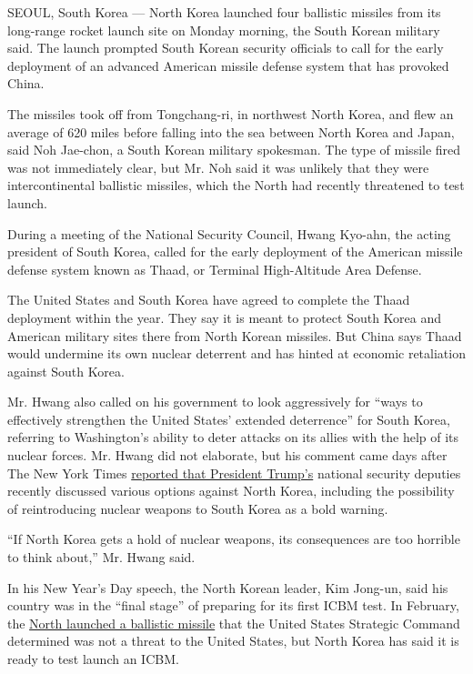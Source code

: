 SEOUL, South Korea --- North Korea launched four ballistic missiles from
its long-range rocket launch site on Monday morning, the South Korean
military said. The launch prompted South Korean security officials to
call for the early deployment of an advanced American missile defense
system that has provoked China.

The missiles took off from Tongchang-ri, in northwest North Korea, and
flew an average of 620 miles before falling into the sea between North
Korea and Japan, said Noh Jae-chon, a South Korean military spokesman.
The type of missile fired was not immediately clear, but Mr. Noh said it
was unlikely that they were intercontinental ballistic missiles, which
the North had recently threatened to test launch.

During a meeting of the National Security Council, Hwang Kyo-ahn, the
acting president of South Korea, called for the early deployment of the
American missile defense system known as Thaad, or Terminal
High-Altitude Area Defense.

The United States and South Korea have agreed to complete the Thaad
deployment within the year. They say it is meant to protect South Korea
and American military sites there from North Korean missiles. But China
says Thaad would undermine its own nuclear deterrent and has hinted at
economic retaliation against South Korea.

Mr. Hwang also called on his government to look aggressively for ``ways
to effectively strengthen the United States' extended deterrence'' for
South Korea, referring to Washington's ability to deter attacks on its
allies with the help of its nuclear forces. Mr. Hwang did not elaborate,
but his comment came days after The New York Times
\href{https://www.nytimes.com/2017/03/04/world/asia/north-korea-missile-program-sabotage.html?rref=collection\%2Fsectioncollection\%2Fasia\&action=click\&contentCollection=asia\&region=stream\&module=stream_unit\&version=latest\&contentPlacement=1\&pgtype=sectionfront\&_r=0}{reported
that President Trump's} national security deputies recently discussed
various options against North Korea, including the possibility of
reintroducing nuclear weapons to South Korea as a bold warning.

``If North Korea gets a hold of nuclear weapons, its consequences are
too horrible to think about,'' Mr. Hwang said.

In his New Year's Day speech, the North Korean leader, Kim Jong-un, said
his country was in the ``final stage'' of preparing for its first ICBM
test. In February, the
\href{https://www.nytimes.com/2017/02/11/world/asia/north-korea-missile-test-trump.html}{North
launched a ballistic missile} that the United States Strategic Command
determined was not a threat to the United States, but North Korea has
said it is ready to test launch an ICBM.

